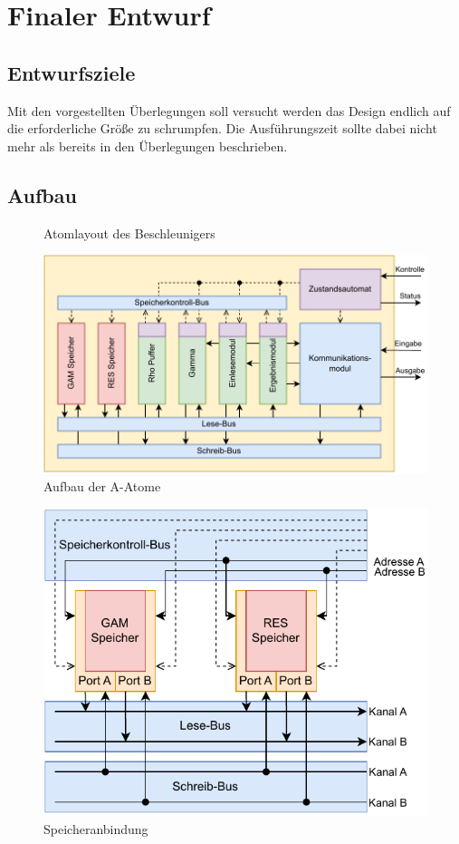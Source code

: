 \section{Finaler Entwurf}
\subsection{Entwurfsziele}
Mit den vorgestellten Überlegungen soll versucht werden das Design endlich auf die erforderliche Größe zu schrumpfen.
Die Ausführungszeit sollte dabei nicht mehr als bereits in den Überlegungen beschrieben.

\subsection{Aufbau}
\begin{figure}
	\center
	\caption{Atomlayout des Beschleunigers}
	\label{fig:layout_iteration_3}
\end{figure}
\begin{figure}
	\center
	\includegraphics{images/iteration_3.pdf}
	\caption{Aufbau der A-Atome}
	\label{fig:aufbau_iteration_3}
\end{figure}
\begin{figure}
	\center
	\includegraphics{images/Speicheranbindung.pdf}
	\caption{Speicheranbindung}
	\label{fig:speicheranbindung_iteration_3}
\end{figure}
